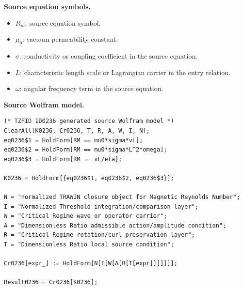 \begin{minipage}[t]{0.49\linewidth}
\begingroup
\small
\raggedright
\textbf{Source equation symbols.}\par
\begin{itemize}[leftmargin=1.35em,itemsep=1pt,topsep=1pt,parsep=0pt]
    \item $R_m$: source equation symbol.
    \item $\mu_0$: vacuum permeability constant.
    \item $\sigma$: conductivity or coupling coefficient in the source equation.
    \item $L$: characteristic length scale or Lagrangian carrier in the entry relation.
    \item $\omega$: angular frequency term in the source equation.
\end{itemize}
\endgroup
\end{minipage}\hfill
\begin{minipage}[t]{0.47\linewidth}
\begingroup
\scriptsize
\raggedright
\textbf{Source Wolfram model.}\par
\begin{Verbatim}[fontsize=\tiny,breaklines=true,breakanywhere=true]
(* TZPID ID0236 generated source Wolfram model *)
ClearAll[K0236, Cr0236, T, R, A, W, I, N];
eq0236$1 = HoldForm[RM == mu0*sigma*vL];
eq0236$2 = HoldForm[RM == mu0*sigma*L^2*omega];
eq0236$3 = HoldForm[RM == vL/eta];

K0236 = HoldForm[{eq0236$1, eq0236$2, eq0236$3}];

N = "normalized TRAWIN closure object for Magnetic Reynolds Number";
I = "Normalized Threshold integration/comparison layer";
W = "Critical Regime wave or operator carrier";
A = "Dimensionless Ratio admissible action/amplitude condition";
R = "Critical Regime rotation/curl preservation layer";
T = "Dimensionless Ratio local source condition";

Cr0236[expr_] := HoldForm[N[I[W[A[R[T[expr]]]]]]];

Result0236 = Cr0236[K0236];
\end{Verbatim}
\endgroup
\end{minipage}

